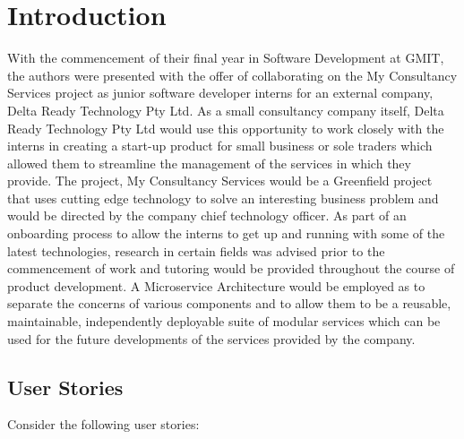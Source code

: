\chapter{Introduction}

With the commencement of their final year in Software Development at GMIT, the authors were presented with the offer of collaborating on the My Consultancy Services project as junior software developer interns for an external company, Delta Ready Technology Pty Ltd\cite{deltareadytechnology}. As a small consultancy company itself, Delta Ready Technology Pty Ltd would use this opportunity to work closely with the interns in creating a start-up product for small business or sole traders which allowed them to streamline the management of the services in which they provide. The project, My Consultancy Services would be a Greenfield project that uses cutting edge technology to solve an interesting business problem and would be directed by the company chief technology officer.
As part of an onboarding process to allow the interns to get up and running with some of the latest technologies, research in certain fields was advised prior to the commencement of work and tutoring would be provided throughout the course of product development. A Microservice Architecture would be employed as to separate the concerns of various components and to allow them to be a reusable, maintainable, independently deployable suite of modular services which can be used for the future developments of the services provided by the company.

\section{User Stories}

Consider the following user stories\cite{userstories}:

